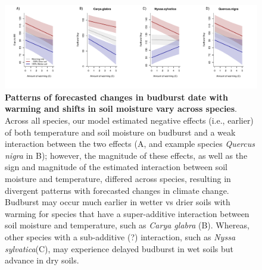 \documentclass{article}
\begin{document}
 
 \begin{figure}[h]
\centering
 \includegraphics{../../Analyses/soilmoisture/figures/tempforecast_bb_0_5_28_105_135_4_degwarm.pdf}
 
 \caption{\textbf{Patterns of forecasted changes in budburst date with warming and shifts in soil moisture vary across species}. Across all species, our model estimated negative effects (i.e., earlier) of both temperature and soil moisture on budburst and a weak interaction between the two effects (A, and example species  \textit{Quercus nigra} in B); however, the magnitude of these effects, as well as the sign and magnitude of the estimated interaction between soil moisture and temperature, differed across species, resulting in divergent patterns with forecasted changes in climate change.  Budburst may occur much earlier in wetter vs drier soils with warming for species that have a super-additive interaction between soil moisture and temperature, such as \textit{Carya glabra} (B). Whereas, other species with a sub-additive (?) interaction, such as \textit{Nyssa sylvatica}(C), may experience delayed budburst in wet soils but advance in dry soils.}
 \label{fig:bbsp}
 \end{figure}

\end{document}

